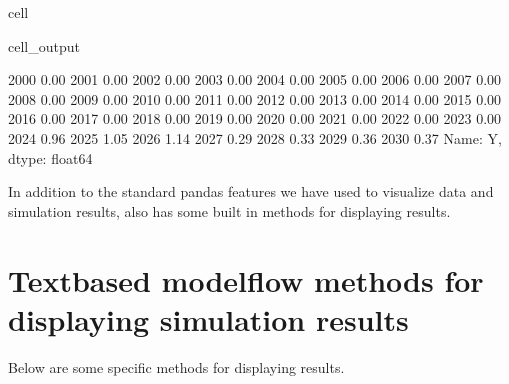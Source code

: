 \documentclass[letterpaper,10pt,english]{jupyterBook}
\begin{document}
\begin{sphinxuseclass}{cell}
\begin{sphinxVerbatimOutput}
\begin{sphinxuseclass}{cell_output}
\begin{sphinxVerbatim}[commandchars=\\\{\}]
2000   0.00
2001   0.00
2002   0.00
2003   0.00
2004   0.00
2005   0.00
2006   0.00
2007   0.00
2008   0.00
2009   0.00
2010   0.00
2011   0.00
2012   0.00
2013   0.00
2014   0.00
2015   0.00
2016   0.00
2017   0.00
2018   0.00
2019   0.00
2020   0.00
2021   0.00
2022   0.00
2023   0.00
2024   0.96
2025   1.05
2026   1.14
2027   0.29
2028   0.33
2029   0.36
2030   0.37
Name: Y, dtype: float64
\end{sphinxVerbatim}

\end{sphinxuseclass}\end{sphinxVerbatimOutput}

\end{sphinxuseclass}
\sphinxAtStartPar
In addition to the standard pandas features we have used to visualize data and simulation results,  also has some built in methods for displaying results.


\section{Text\sphinxhyphen{}based modelflow methods for displaying simulation results}
\label{\detokenize{content/05_SimpleModel/SimpleModel:text-based-modelflow-methods-for-displaying-simulation-results}}
\sphinxAtStartPar
Below are some  specific methods for displaying results.
\end{document}
